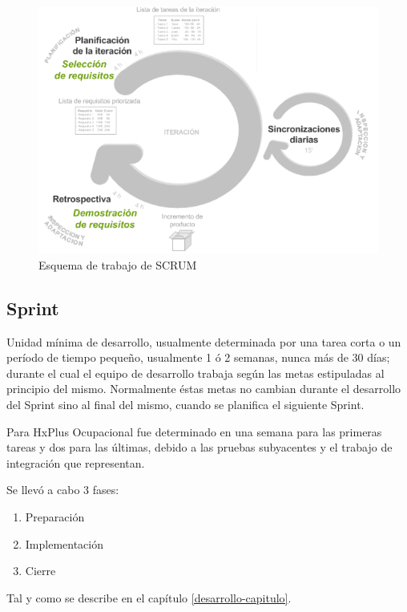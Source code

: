     \begin{figure}[htbp!]
        \begin{center}
            \includegraphics[width=.8\textwidth]{figures/scrum}
        \end{center}
        \caption{Esquema de trabajo de SCRUM}
        \label{scrum-esquema}
    \end{figure}
    
        \subsection{Sprint}
        
        Unidad mínima de desarrollo, usualmente determinada por una tarea corta o un período de tiempo pequeño, usualmente 1 ó 2 semanas, nunca más de 30 días; durante el cual el equipo de desarrollo trabaja según las metas estipuladas al principio del mismo. Normalmente éstas metas no cambian durante el desarrollo del Sprint sino al final del mismo, cuando se planifica el siguiente Sprint.
        
        Para HxPlus Ocupacional fue determinado en una semana para las primeras tareas y dos para las últimas, debido a las pruebas subyacentes y el trabajo de integración que representan.
        
        Se llevó a cabo 3 fases:
        \begin{enumerate}
            \item Preparación
            \item Implementación
            \item Cierre
        \end{enumerate}
        
        Tal y como se describe en el capítulo \ref{desarrollo-capitulo}.
        
